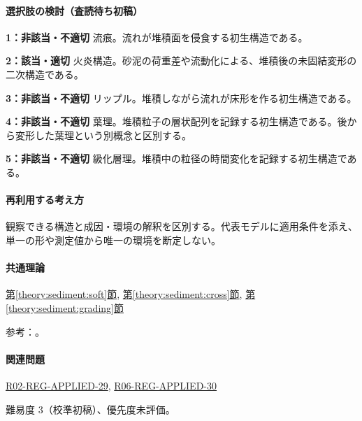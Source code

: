 \paragraph{選択肢の検討（査読待ち初稿）}\mbox{}\par

\noindent\textbf{1：非該当・不適切} 流痕。流れが堆積面を侵食する初生構造である。\par

\noindent\textbf{2：該当・適切} 火炎構造。砂泥の荷重差や流動化による、堆積後の未固結変形の二次構造である。\par

\noindent\textbf{3：非該当・不適切} リップル。堆積しながら流れが床形を作る初生構造である。\par

\noindent\textbf{4：非該当・不適切} 葉理。堆積粒子の層状配列を記録する初生構造である。後から変形した葉理という別概念と区別する。\par

\noindent\textbf{5：非該当・不適切} 級化層理。堆積中の粒径の時間変化を記録する初生構造である。\par

\paragraph{再利用する考え方} 観察できる構造と成因・環境の解釈を区別する。代表モデルに適用条件を添え、単一の形や測定値から唯一の環境を断定しない。

\paragraph{共通理論} \hyperref[theory:sediment:soft]{第\ref*{theory:sediment:soft}節}, \hyperref[theory:sediment:cross]{第\ref*{theory:sediment:cross}節}, \hyperref[theory:sediment:grading]{第\ref*{theory:sediment:grading}節}

\par 参考：\cite{sed_soft_deformation,sed_houston_structures}。

\paragraph{関連問題} \hyperref[q:r02-reg-applied-29]{R02-REG-APPLIED-29}, \hyperref[q:r06-reg-applied-30]{R06-REG-APPLIED-30}

\par 難易度 3（校準初稿）、優先度未評価。

